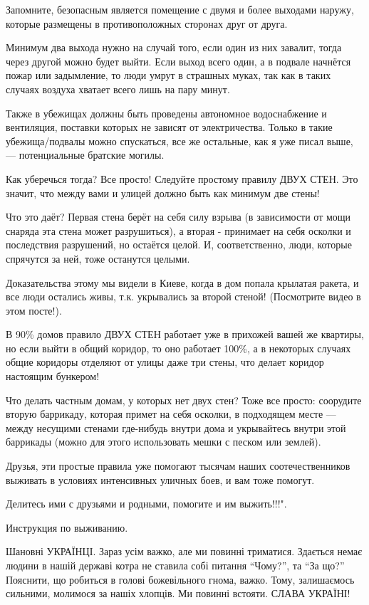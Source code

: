 \begin{itemize}
Запомните, безопасным является помещение с двумя и более выходами наружу,
которые размещены в противоположных сторонах друг от друга.

Минимум два выхода нужно на случай того, если один из них завалит, тогда через
другой можно будет выйти. Если выход всего один, а в подвале начнётся пожар или
задымление, то люди умрут в страшных муках, так как в таких случаях воздуха
хватает всего лишь на пару минут.

Также в убежищах должны быть проведены автономное водоснабжение и вентиляция,
поставки которых не зависят от электричества. Только в такие убежища/подвалы
можно спускаться, все же остальные, как я уже писал выше, — потенциальные
братские могилы.

Как уберечься тогда? Все просто! Следуйте простому правилу ДВУХ СТЕН. Это
значит, что между вами и улицей должно быть как минимум две стены!

Что это даёт? Первая стена берёт на себя силу взрыва (в зависимости от мощи
снаряда эта стена может разрушиться), а вторая - принимает на себя осколки и
последствия разрушений, но остаётся целой. И, соответственно, люди, которые
спрячутся за ней, тоже останутся целыми.

Доказательства этому мы видели в Киеве, когда в дом попала крылатая ракета, и
все люди остались живы, т.к. укрывались за второй стеной! (Посмотрите видео в
этом посте!).

В 90\% домов правило ДВУХ СТЕН работает уже в прихожей вашей же квартиры, но
если выйти в общий коридор, то оно работает 100\%, а в некоторых случаях общие
коридоры отделяют от улицы даже три стены, что делает коридор настоящим
бункером!

Что делать частным домам, у которых нет двух стен? Тоже все просто: соорудите
вторую баррикаду, которая примет на себя осколки, в подходящем месте — между
несущими стенами где-нибудь внутри дома и укрывайтесь внутри этой баррикады
(можно для этого использовать мешки с песком или землей).

Друзья, эти простые правила уже помогают тысячам наших соотечественников
выживать в условиях интенсивных уличных боев, и вам тоже помогут.

Делитесь ими с друзьями и родными, помогите и им выжить!!!".

Инструкция по выживанию.


Шановні УКРАЇНЦІ. Зараз усім важко, але ми повинні триматися. Здається немає
людини в нашій державі котра не ставила собі питання \enquote{Чому?}, та \enquote{За що?}
Пояснити, що робиться в голові божевільного гнома, важко. Тому, залишаємось
сильними, молимося за нашіх хлопців. Ми повинні встояти. СЛАВА УКРАЇНІ!


\end{itemize}
